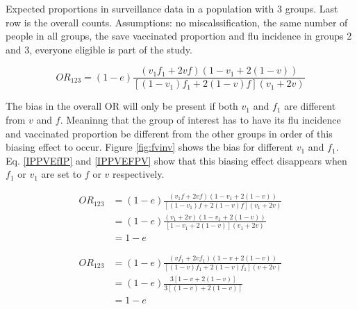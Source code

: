 \documentclass[11pt]{article}
\begin{document}
\begin{table}[h]
\centering
\caption{
Expected proportions in surveillance data in a population with 3 groups. Last row is the overall counts. 
Assumptions: no miscalssification, the same number of people in all groups, the save vaccinated proportion and flu incidence in groups 2 and 3, everyone eligible is part of the study. \label{tab:fvcounts}
}
	
\end{table}

\begin{equation} \label{ORIPfPv}
OR_{123}=(1-e)\frac{(v_1f_1+2vf)(1-v_1+2(1-v))}{[(1-v_1)f_1+2(1-v)f](v_1+2v)}
\end{equation}

The bias in the overall OR will only be present if both $v_1$ and $f_1$ are different from $v$ and $f$. Meaninng that the group of interest has to have its flu incidence and vaccinated proportion be different from the other groups in order of this biasing effect to occur. Figure \ref{fig:fvinv} shows the bias for different $v_1$ and $f_1$. Eq. \ref{IPPVEfIP} and \ref{IPPVEFPV} show that this biasing effect disappears when $f_1$ or $v_1$ are set to $f$ or $v$ respectively.

\begin{equation} \label{IPPVEfIP}
\begin{aligned}
OR_{123}&=(1-e)\frac{(v_1f+2vf)(1-v_1+2(1-v))}{[(1-v_1)f+2(1-v)f](v_1+2v)} \\
&=(1-e)\frac{(v_1+2v)(1-v_1+2(1-v))}{[1-v_1+2(1-v)](v_1+2v)} \\
&=1-e
\end{aligned}
\end{equation}

\begin{equation} \label{IPPVEFPV}
\begin{aligned}
OR_{123}&=(1-e)\frac{(vf_1+2vf_1)(1-v+2(1-v))}{[(1-v)f_1+2(1-v)f_1](v+2v)} \\
&=(1-e)\frac{3[1-v+2(1-v)]}{3[(1-v)+2(1-v)]} \\
&=1-e
\end{aligned}
\end{equation} 
\end{document}
